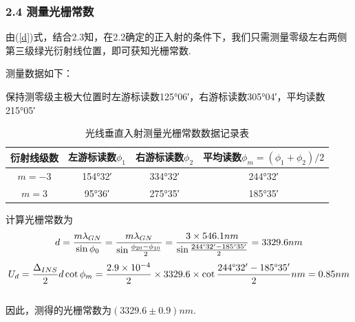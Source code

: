 \documentclass[UTF8]{ctexart}
\begin{document}
\subsubsection*{2.4 测量光栅常数}
由(\ref{d})式，结合2.3知，在2.2确定的正入射的条件下，我们只需测量零级左右两侧第三级绿光衍射线位置，即可获知光栅常数.\par
测量数据如下：
\\\par
\begin{center}
保持测零级主极大位置时左游标读数125°06′，右游标读数305°04′，平均读数215°05′\vspace{-1em}
\end{center}
\begin{table}[H]\begin{center}
    \caption{光线垂直入射测量光栅常数数据记录表}
    \begin{tabular}{|c|c|c|c|}
        \hline
        衍射线级数&左游标读数$\phi_1$&右游标读数$\phi_2$&平均读数$\phi_m=(\phi_1+\phi_2)/2$\\
        \hline
        $m=-3$&	154°32′ &334°32′&	244°32′\\
        \hline
        $m=3$	&	95°36′& 275°35′&	185°35′\\
        \hline        
    \end{tabular}
\end{center}\end{table}
计算光栅常数为\\
\[d=\frac{m\lambda_{GN}}{\sin\phi_0}=\frac{m\lambda_{GN}}{\sin\frac{\phi_{20}-\phi_{10}}{2}}=\frac{3\times546.1nm}{\sin\frac{244\degree32'-185\degree35'}{2}}=3329.6nm\]
\[U_d=\frac{\Delta_{INS}}{2}d \cot\phi_m=\frac{2.9\times10^{-4}}{2}\times3329.6\times\cot{\frac{244\degree32'-185\degree35'}{2}}nm=0.85nm\]\\
因此，测得的光栅常数为$(3329.6\pm0.9)nm$.
\end{document}
